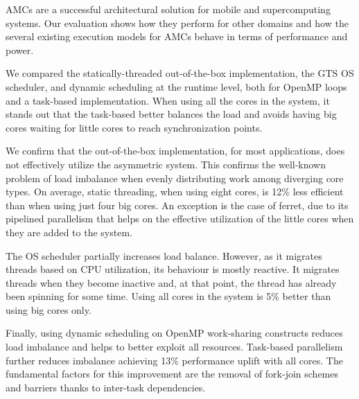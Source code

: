 


\iffalse 
AMCs are a successful architectural solution for mobile and supercomputing systems. 
Our evaluation shows how they perform for other domains and how the several existing execution models for AMCs behave in terms of performance and power. 

We compared the statically-threaded out-of-the-box implementation, the GTS OS scheduler, and dynamic scheduling at the runtime level, both for OpenMP loops and a task-based implementation. 
When using all the cores in the system, it stands out that the task-based better balances the load and avoids having big cores waiting for little cores to reach synchronization points.

We confirm that the out-of-the-box implementation, for most applications, does not effectively utilize the asymmetric system.
This confirms the well-known problem of load imbalance when evenly distributing work among diverging core types. 
On average, static threading, when using eight cores, is 12\% less efficient than when using just four big cores.
An exception is the case of ferret, due to its pipelined parallelism that helps on the effective utilization of the little cores when they are added to the system.

The OS scheduler partially increases load balance. 
However, as it migrates threads based on CPU utilization, its behaviour is mostly reactive. 
It migrates threads when they become inactive and, at that point, the thread has already been spinning for some time. 
Using all cores in the system is 5\% better than using big cores only.

Finally, using dynamic scheduling on OpenMP work-sharing constructs reduces load imbalance and helps to better exploit all resources.
Task-based parallelism further reduces imbalance achieving 13\% performance uplift with all cores. 
The fundamental factors for this improvement are the removal of fork-join schemes and barriers
thanks to inter-task dependencies.

